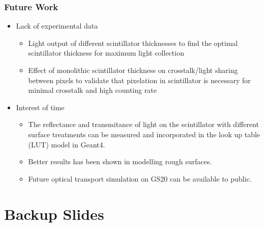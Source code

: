\documentclass[xcolor=x11names, compress, handout]{beamer}
\renewcommand{\(}{\begin{columns}}
\renewcommand{\)}{\end{columns}}
\newcommand{\<}[1]{\begin{column}{#1}}
\renewcommand{\>}{\end{column}}
\begin{document}
\begin{frame}
\frametitle{Future Work}
\scriptsize
\begin{itemize}
  \item Lack of experimental data \\
    \begin{itemize}
      \scriptsize
      \item Light output of different scintillator thicknesses to find the optimal scintillator thickness for maximum light collection
      \item Effect of monolithic scintillator thickness on crosstalk/light sharing between pixels to validate that pixelation in scintillator is necessary for minimal crosstalk and high counting rate
     
    \end{itemize}

  \item Interest of time \\
  \begin{itemize}
    \scriptsize
    \item The reflectance and transmitance of light on the scintillator with different surface treatments can be measured and incorporated in the look up table (LUT) model in Geant4. 
    \item Better results has been shown in modelling rough surfaces. 
    \item Future optical transport simulation on GS20 can be available to public. 
  \end{itemize}
\end{itemize}

\vfill
\end{frame}



\appendix

\section{Backup Slides}
\end{document}
